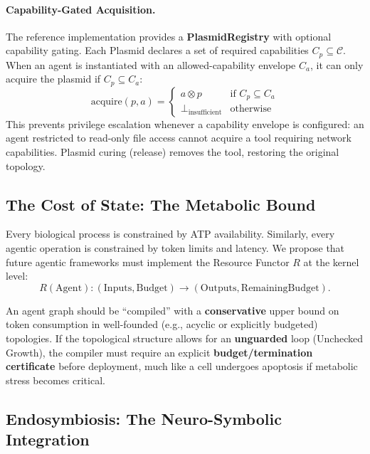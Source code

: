 \paragraph{Capability-Gated Acquisition.}
The reference implementation provides a \textbf{PlasmidRegistry} with optional capability gating. Each Plasmid declares a set of required capabilities $C_p \subseteq \mathcal{C}$. When an agent is instantiated with an allowed-capability envelope $C_a$, it can only acquire the plasmid if $C_p \subseteq C_a$:
\begin{equation}
\mathrm{acquire}(p, a) =
\begin{cases}
a \otimes p & \text{if } C_p \subseteq C_a \\
\bot_{\text{insufficient}} & \text{otherwise}
\end{cases}
\label{eq:capability-gated-acquisition}
\end{equation}
This prevents privilege escalation whenever a capability envelope is configured: an agent restricted to read-only file access cannot acquire a tool requiring network capabilities. Plasmid curing (release) removes the tool, restoring the original topology.

\subsection{The Cost of State: The Metabolic Bound}

Every biological process is constrained by ATP availability. Similarly, every agentic operation is constrained
by token limits and latency. We propose that future agentic frameworks must implement the Resource Functor $R$ at
the kernel level:
\begin{equation}
R(\mathrm{Agent}): (\mathrm{Inputs}, \mathrm{Budget}) \to (\mathrm{Outputs}, \mathrm{RemainingBudget}).
\label{eq:resource-functor}
\end{equation}

An agent graph should be ``compiled'' with a \textbf{conservative} upper bound on token consumption in well-founded
(e.g., acyclic or explicitly budgeted) topologies. If the topological structure allows for an \textbf{unguarded}
loop (Unchecked Growth), the compiler must require an explicit \textbf{budget/termination certificate} before
deployment, much like a cell undergoes apoptosis if metabolic stress becomes critical.

\subsection{Endosymbiosis: The Neuro-Symbolic Integration}


